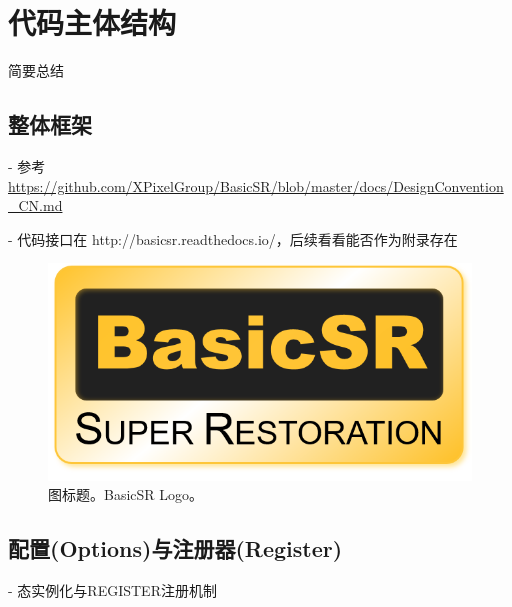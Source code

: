 \documentclass[../main.tex]{subfiles}
\begin{document}
\chapter{代码主体结构}
\vspace{-2cm}

简要总结

\section{整体框架}

- 参考 \url{https://github.com/XPixelGroup/BasicSR/blob/master/docs/DesignConvention_CN.md}

- 代码接口在 http://basicsr.readthedocs.io/，后续看看能否作为附录存在

\begin{figure}[t]
    \begin{center}
        \includegraphics[width=\linewidth]{figures/basicsr_logo.png}
        \vspace{-1cm}
        \caption{图标题。BasicSR Logo。}
        \label{fig:logo}
    \end{center}
\end{figure}

\section{配置(Options)与注册器(Register)}\label{Register}

- 态实例化与REGISTER注册机制
\end{document}
